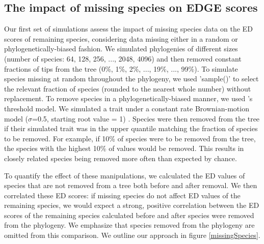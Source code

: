 \documentclass[10pt,english]{article}
\begin{document}
\subsection*{The impact of missing species on EDGE scores}
Our first set of simulations assess the impact of missing species data on the ED
scores of remaining species, considering data missing either in a random or
phylogenetically-biased fashion. We simulated phylogenies of different sizes
(number of species: 64, 128, 256, ..., 2048, 4096) and then removed constant
fractions of tips from the tree (0\%, 1\%, 2\%, ..., 19\%, ..., 99\%). To
simulate species missing at random throughout the phylogeny, we used 'sample()'
to select the relevant fraction of species (rounded to the nearest whole number)
without replacement. To remove species in a phylogenetically-biased manner, we
used \textcite{Felsenstein2005}'s threshold model. We simulated a trait under a
constant rate Brownian-motion model ($\sigma$=0.5, starting root value = 1)
\autocite[using 'geiger::sim.char'][]{Pennell2014}. Species were then removed
from the tree if their simulated trait was in the upper quantile matching the
fraction of species to be removed. For example, if 10\% of species were to be
removed from the tree, the species with the highest 10\% of values would be
removed. This results in closely related species being removed more often than
expected by chance.

To quantify the effect of these manipulations, we calculated the ED values of
species that are not removed from a tree both before and after removal. We then
correlated these ED scores: if missing species do not affect ED values of the
remaining species, we would expect a strong, positive correlation between the ED
scores of the remaining species calculated before and after species were removed
from the phylogeny. We emphasize that species removed from the phylogeny are
omitted from this comparison. We outline our approach in figure
\ref{missingSpecies}.
\end{document}
